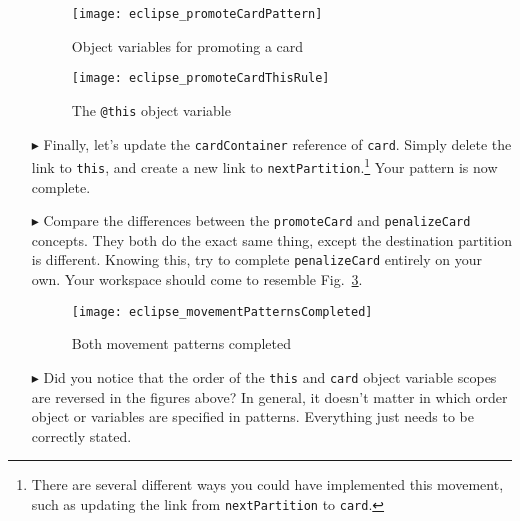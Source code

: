 \begin{itemize}
\begin{figure}[htbp]
\begin{center}
  \texttt{[image: eclipse\_promoteCardPattern]}
  \caption{Object variables for promoting a card}
  \label{eclipse:promoteCardPattern}
\end{center}
\end{figure} 

\begin{figure}[htbp]
\begin{center}
  \texttt{[image: eclipse\_promoteCardThisRule]}
  \caption{The \texttt{@this} object variable}
  \label{eclipse:promoteThisRule}
\end{center}
\end{figure} 

\item[$\blacktriangleright$] Finally, let's update the \texttt{cardContainer} reference of \texttt{card}. Simply delete the link to \texttt{this}, and create
a new link to \texttt{nextPartition}.\footnote{There are several different ways you could have implemented this movement, such as updating the link from
\texttt{nextPartition} to \texttt{card}.} Your pattern is now complete.

\vspace{0.5cm}

\item[$\blacktriangleright$] Compare the differences between the \texttt{promoteCard} and \texttt{penalizeCard} concepts. They both do the exact same thing,
except the destination partition is different. Knowing this, try to complete \texttt{penalizeCard} entirely on your own. Your workspace should come to
resemble Fig.~\ref{eclipse:completedPatterns}.

\newpage

\begin{figure}[htbp]
\begin{center}
  \texttt{[image: eclipse\_movementPatternsCompleted]}
  \caption{Both movement patterns completed}
  \label{eclipse:completedPatterns}
\end{center}
\end{figure}

\item[$\blacktriangleright$] Did you notice that the order of the \texttt{this} and \texttt{card} object variable scopes are reversed in the figures above?
In general, it doesn't matter in which order object or variables are specified in patterns. Everything just needs to be correctly stated. 


\end{itemize}
